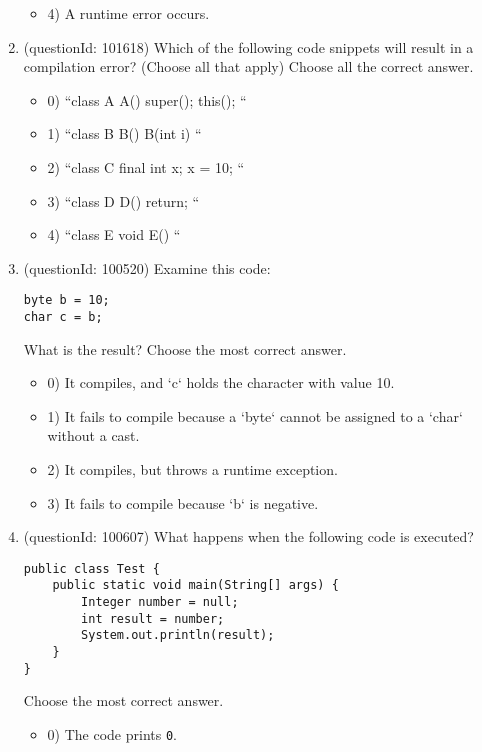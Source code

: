\documentclass[12pt]{article}
\begin{document}
\begin{enumerate}[label=(\arabic*)]
\begin{itemize}
\item 4) A runtime error occurs.

\end{itemize}
\item (questionId: 101618) Which of the following code snippets will result in a compilation error? (Choose all that apply)
Choose all the correct answer.\begin{itemize}
\item 0) ``class A { A() { super(); this(); } }``

\item 1) ``class B { B() { } B(int i) { } }``

\item 2) ``class C { final int x; { x = 10; } }``

\item 3) ``class D { D() { return; } }``

\item 4) ``class E { void E() {} }``

\end{itemize}
\item (questionId: 100520) Examine this code:
\begin{verbatim}
byte b = 10;
char c = b;
\end{verbatim}
What is the result?
Choose the most correct answer. 
\begin{itemize}
\item 0) It compiles, and `c` holds the character with value 10.

\item 1) It fails to compile because a `byte` cannot be assigned to a `char` without a cast.

\item 2) It compiles, but throws a runtime exception.

\item 3) It fails to compile because `b` is negative.

\end{itemize}
\item (questionId: 100607) What happens when the following code is executed?\n\begin{verbatim}
public class Test {
    public static void main(String[] args) {
        Integer number = null;
        int result = number;
        System.out.println(result);
    }
}
\end{verbatim}
Choose the most correct answer. 
\begin{itemize}
\item 0) The code prints \verb|0|.


\end{itemize}
\end{enumerate}
\end{document}
